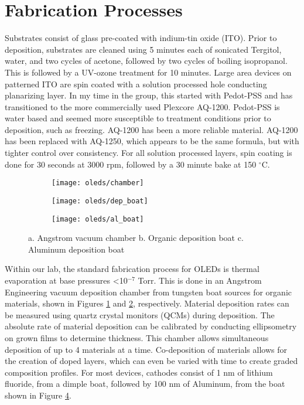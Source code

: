 \documentclass[../thesis.tex]{subfiles}
\begin{document}
\section{Fabrication Processes}\label{sec:oleds_fabrication}

Substrates consist of glass pre-coated with indium-tin oxide (ITO).  
Prior to deposition, substrates are cleaned using 5 minutes each of sonicated Tergitol, water, and two cycles of acetone, followed by two cycles of boiling isopropanol.  
This is followed by a UV-ozone treatment for 10 minutes.  
Large area devices on patterned ITO are spin coated with a solution processed hole conducting planarizing layer.
In my time in the group, this started with Pedot-PSS and has transitioned to the more commercially used Plexcore AQ-1200.
Pedot-PSS is water based and seemed more susceptible to treatment conditions prior to deposition, such as freezing.
AQ-1200 has been a more reliable material.
AQ-1200 has been replaced with AQ-1250, which appears to be the same formula, but with tighter control over consistency.
For all solution processed layers, spin coating is done for 30 seconds at 3000 rpm, followed by a 30 minute bake at 150 $^\circ$C.

\begin{figure}[ht]
    \centering
    \begin{subfigure}{.3\textwidth}
    \texttt{[image: oleds/chamber]}
    \caption{}
    \label{fig:oleds_angstrom}\par\vfill
    \end{subfigure}
    \begin{subfigure}{.3\textwidth}
    \texttt{[image: oleds/dep\_boat]}
    \caption{}
    \label{fig:oleds_deposition_boat}
    \end{subfigure}
    \begin{subfigure}{.3\textwidth}
    \texttt{[image: oleds/al\_boat]}
    \caption{}
    \label{fig:oleds_al_boat}
    \end{subfigure}
\caption{a. Angstrom vacuum chamber b. Organic deposition boat c. Aluminum deposition boat}
\end{figure}

Within our lab, the standard fabrication process for OLEDs is thermal evaporation at base pressures <10$^{-7}$ Torr.  
This is done in an Angstrom Engineering vacuum deposition chamber from tungsten boat sources for organic materials, shown in Figures \ref{fig:oleds_angstrom} and \ref{fig:oleds_deposition_boat}, respectively.
Material deposition rates can be measured using quartz crystal monitors (QCMs) during deposition.
The absolute rate of material deposition can be calibrated by conducting ellipsometry on grown films to determine thickness.
This chamber allows simultaneous deposition of up to 4 materials at a time.
Co-deposition of materials allows for the creation of doped layers, which can even be varied with time to create graded composition profiles.
For most devices, cathodes consist of 1 nm of lithium fluoride, from a dimple boat, followed by 100 nm of Aluminum, from the boat shown in Figure \ref{fig:oleds_al_boat}.
\end{document}
